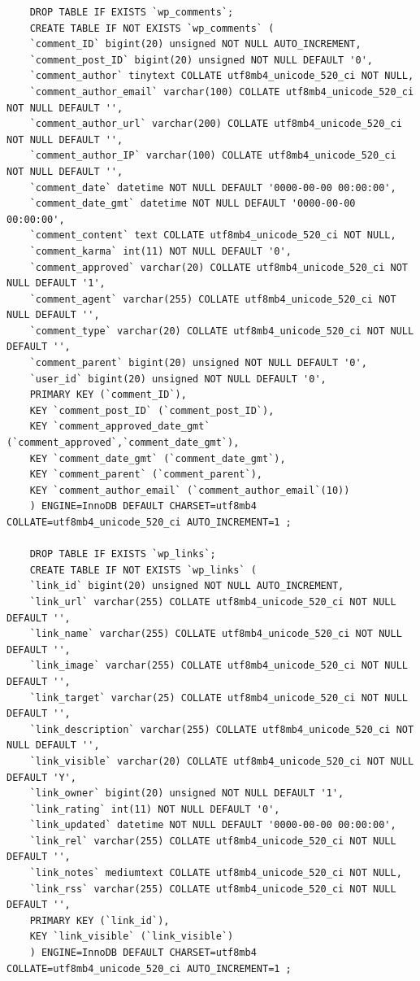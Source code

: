 \documentclass[10pt,a4paper]{article}
\begin{document}
\begin{lstlisting}
	DROP TABLE IF EXISTS `wp_comments`;
	CREATE TABLE IF NOT EXISTS `wp_comments` (
	`comment_ID` bigint(20) unsigned NOT NULL AUTO_INCREMENT,
	`comment_post_ID` bigint(20) unsigned NOT NULL DEFAULT '0',
	`comment_author` tinytext COLLATE utf8mb4_unicode_520_ci NOT NULL,
	`comment_author_email` varchar(100) COLLATE utf8mb4_unicode_520_ci NOT NULL DEFAULT '',
	`comment_author_url` varchar(200) COLLATE utf8mb4_unicode_520_ci NOT NULL DEFAULT '',
	`comment_author_IP` varchar(100) COLLATE utf8mb4_unicode_520_ci NOT NULL DEFAULT '',
	`comment_date` datetime NOT NULL DEFAULT '0000-00-00 00:00:00',
	`comment_date_gmt` datetime NOT NULL DEFAULT '0000-00-00 00:00:00',
	`comment_content` text COLLATE utf8mb4_unicode_520_ci NOT NULL,
	`comment_karma` int(11) NOT NULL DEFAULT '0',
	`comment_approved` varchar(20) COLLATE utf8mb4_unicode_520_ci NOT NULL DEFAULT '1',
	`comment_agent` varchar(255) COLLATE utf8mb4_unicode_520_ci NOT NULL DEFAULT '',
	`comment_type` varchar(20) COLLATE utf8mb4_unicode_520_ci NOT NULL DEFAULT '',
	`comment_parent` bigint(20) unsigned NOT NULL DEFAULT '0',
	`user_id` bigint(20) unsigned NOT NULL DEFAULT '0',
	PRIMARY KEY (`comment_ID`),
	KEY `comment_post_ID` (`comment_post_ID`),
	KEY `comment_approved_date_gmt` (`comment_approved`,`comment_date_gmt`),
	KEY `comment_date_gmt` (`comment_date_gmt`),
	KEY `comment_parent` (`comment_parent`),
	KEY `comment_author_email` (`comment_author_email`(10))
	) ENGINE=InnoDB DEFAULT CHARSET=utf8mb4 COLLATE=utf8mb4_unicode_520_ci AUTO_INCREMENT=1 ;
	
	DROP TABLE IF EXISTS `wp_links`;
	CREATE TABLE IF NOT EXISTS `wp_links` (
	`link_id` bigint(20) unsigned NOT NULL AUTO_INCREMENT,
	`link_url` varchar(255) COLLATE utf8mb4_unicode_520_ci NOT NULL DEFAULT '',
	`link_name` varchar(255) COLLATE utf8mb4_unicode_520_ci NOT NULL DEFAULT '',
	`link_image` varchar(255) COLLATE utf8mb4_unicode_520_ci NOT NULL DEFAULT '',
	`link_target` varchar(25) COLLATE utf8mb4_unicode_520_ci NOT NULL DEFAULT '',
	`link_description` varchar(255) COLLATE utf8mb4_unicode_520_ci NOT NULL DEFAULT '',
	`link_visible` varchar(20) COLLATE utf8mb4_unicode_520_ci NOT NULL DEFAULT 'Y',
	`link_owner` bigint(20) unsigned NOT NULL DEFAULT '1',
	`link_rating` int(11) NOT NULL DEFAULT '0',
	`link_updated` datetime NOT NULL DEFAULT '0000-00-00 00:00:00',
	`link_rel` varchar(255) COLLATE utf8mb4_unicode_520_ci NOT NULL DEFAULT '',
	`link_notes` mediumtext COLLATE utf8mb4_unicode_520_ci NOT NULL,
	`link_rss` varchar(255) COLLATE utf8mb4_unicode_520_ci NOT NULL DEFAULT '',
	PRIMARY KEY (`link_id`),
	KEY `link_visible` (`link_visible`)
	) ENGINE=InnoDB DEFAULT CHARSET=utf8mb4 COLLATE=utf8mb4_unicode_520_ci AUTO_INCREMENT=1 ;
	

\end{lstlisting}
\end{document}
